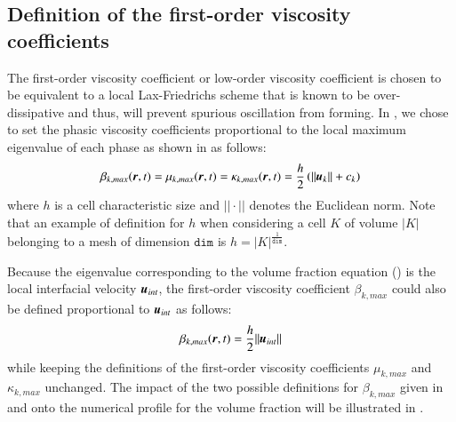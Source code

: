 \documentclass[preprint,10pt]{elsarticle}
\begin{document}
\subsection{Definition of the first-order viscosity coefficients}\label{sec:visc-coeff-fo}
%
The first-order viscosity coefficient or low-order viscosity coefficient is chosen to be equivalent to a local Lax-Friedrichs scheme that is known to be over-
dissipative and thus, will prevent spurious oscillation from forming. In \cite{Marco_paper_sem}, we chose to set the phasic viscosity 
coefficients proportional to the local maximum eigenvalue of each phase as shown in  as follows:
%
\begin{equation}\label{eq:visc-coeff-fo-def-1}
\beta_{k,max}(\boldsymbol r,t) = \mu_{k,max}(\boldsymbol r,t) = \kappa_{k,max}(\boldsymbol r,t) = \frac{h}{2} \left( || \boldsymbol u_k || + c_k \right)
\end{equation}
%
where $h$ is a cell characteristic size and $|| \cdot ||$ denotes the Euclidean norm. Note that an example of definition for $h$ when considering a 
cell $K$ of volume $|K|$ belonging to a mesh of dimension 
$\texttt{dim}$ is $h = |K|^\frac{1}{\texttt{dim}}$. 
%
\begin{remark}
Because the eigenvalue corresponding to the volume fraction equation () is the local interfacial velocity $\boldsymbol u_{int}$,
the first-order viscosity coefficient $\beta_{k,max}$ could also be defined proportional to $\boldsymbol u_{int}$ as follows:
%
\begin{equation}\label{eq:visc-coeff-fo-def-2}
\beta_{k,max}(\boldsymbol r,t) = \frac{h}{2} || \boldsymbol u_{int} ||
\end{equation}
%
while keeping the definitions of the first-order viscosity coefficients $\mu_{k,max}$ and $\kappa_{k,max}$ unchanged.
The impact of the two possible definitions for $\beta_{k,max}$ given in  and  onto the numerical 
profile for the volume fraction will be illustrated in .
\end{remark}
%
\end{document}

